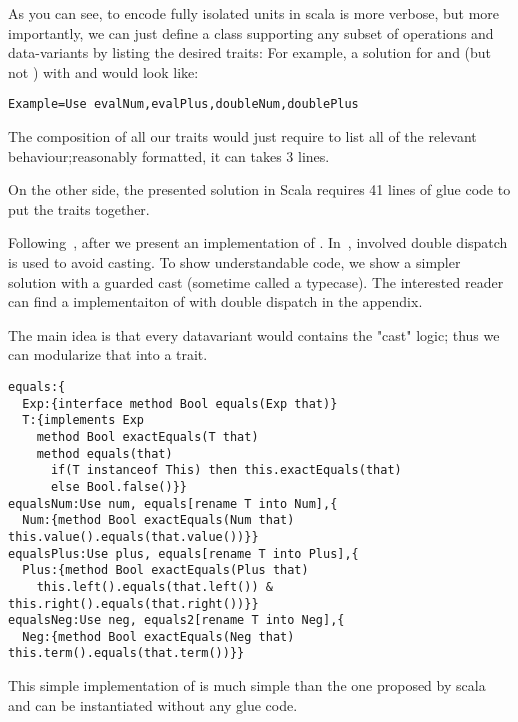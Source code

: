 As you can see, to encode fully isolated units in scala is
more verbose,
but more importantly,
we can just define a class supporting any subset of operations
and data-variants by listing the desired traits:
For example, a solution for \Q@Num@ and \Q@Plus@ (but not \Q@Neg@)
with \Q@eval@ and \Q@double@ would look like:
\begin{lstlisting}
Example=Use evalNum,evalPlus,doubleNum,doublePlus
\end{lstlisting}
The composition of all our traits would just require to list all
of the relevant behaviour;reasonably formatted, it can takes 3 lines.

On the other side, the presented solution in Scala requires
41 lines of glue code to put the traits together.

Following~\cite{}, after \Q@double@ we present an implementation of \Q@equals@.
In~\cite{}, involved double dispatch is used to avoid casting.
To show understandable code, we show a simpler solution 
with a guarded cast (sometime called a typecase).
The interested reader can find a \name implementaiton of \Q@equals@ with double dispatch
in the appendix.

The main idea is that  every datavariant would contains
 the "cast" logic; thus
 we can modularize that into a \Q@expEquals@ trait.
\begin{lstlisting}
equals:{
  Exp:{interface method Bool equals(Exp that)}
  T:{implements Exp
    method Bool exactEquals(T that)
    method equals(that) 
      if(T instanceof This) then this.exactEquals(that)
      else Bool.false()}}
equalsNum:Use num, equals[rename T into Num],{
  Num:{method Bool exactEquals(Num that) this.value().equals(that.value())}}
equalsPlus:Use plus, equals[rename T into Plus],{
  Plus:{method Bool exactEquals(Plus that)
    this.left().equals(that.left()) & this.right().equals(that.right())}}
equalsNeg:Use neg, equals2[rename T into Neg],{
  Neg:{method Bool exactEquals(Neg that) this.term().equals(that.term())}}
\end{lstlisting}

This simple implementation of \Q@equals@
is much simple than the one proposed by scala
 and can be instantiated without any glue code.

